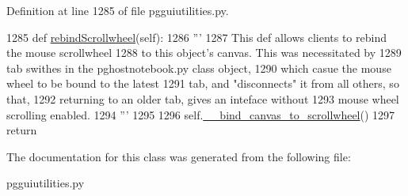 Definition at line 1285 of file pgguiutilities.\+py.


\begin{DoxyCode}
1285     \textcolor{keyword}{def }\hyperlink{classnegui_1_1pgguiutilities_1_1FrameContainerScrolled_afcc54f75cc509614a3d265d6578cc147}{rebindScrollwheel}(self):
1286         \textcolor{stringliteral}{'''}
1287 \textcolor{stringliteral}{        This def allows clients to rebind the mouse scrollwheel}
1288 \textcolor{stringliteral}{        to this object's canvas.  This was necessitated by}
1289 \textcolor{stringliteral}{        tab swithes in the pghostnotebook.py class object,}
1290 \textcolor{stringliteral}{        which casue the mouse wheel to be bound to the latest}
1291 \textcolor{stringliteral}{        tab, and "disconnects" it from all others, so that,}
1292 \textcolor{stringliteral}{        returning to an older tab, gives an inteface without}
1293 \textcolor{stringliteral}{        mouse wheel scrolling enabled.}
1294 \textcolor{stringliteral}{        '''}
1295 
1296         self.\hyperlink{classnegui_1_1pgguiutilities_1_1FrameContainerScrolled_a4d43cdbefdf2cb397141a0a74a87c629}{\_\_bind\_canvas\_to\_scrollwheel}()
1297         \textcolor{keywordflow}{return}
\end{DoxyCode}


The documentation for this class was generated from the following file\+:\begin{DoxyCompactItemize}
\item 
pgguiutilities.\+py\end{DoxyCompactItemize}
